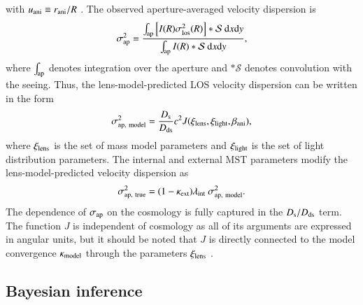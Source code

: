 \documentclass[longauth]{aa}
\newcommand{\Ds}{D_{\rm s}}
\newcommand{\Dds}{D_{\rm ds}}
\newcommand{\rmd}{{\rm d}}
\newcommand{\ajs}[1]{{{#1}}}
\newcommand{\ajsiv}[1]{{{#1}}}
\newcommand{\lreply}[1]{{{#1}}}
\begin{document}
%
with $u_{\rm ani} \equiv r_{\rm ani}/R$ \citep{Mamon05}. The observed aperture-averaged velocity dispersion is
%
\begin{equation} \label{eq:jeans_solution_convolved}
        \sigma_{\rm ap}^2 = \frac{\int_{\rm ap} \left[ I(R) \sigma_{\rm los}^2(R) \right] * \mathcal{S}\ \rmd x \rmd y}{\int_{\rm ap} I(R) * \mathcal{S} \ \rmd x \rmd y},
\end{equation}
%
where $\int_{\rm ap}$ denotes integration over the aperture and $* \mathcal{S}$ denotes convolution with the seeing. Thus, the lens-model-predicted LOS velocity dispersion can be written in the form
%
\begin{equation} \label{eq:vdisp_ap}
        \sigma_{\rm ap,\ model}^2 = \frac{\Ds}{\Dds} c^2 J(\xi_{\rm lens}, \xi_{\rm light}, \beta_{\rm ani}),
\end{equation}
% 
where $\xi_{\rm lens}$ is the set of mass model parameters \ajsiv{and} $\xi_{\rm light}$ is the set of light distribution parameters. \ajs{The internal and external MST parameters modify the lens-model-predicted velocity dispersion as}  
%
\begin{equation} \label{eq:vdisp_ap}
        \sigma_{\rm ap,\ true}^2 = (1 - \kappa_{\rm ext}) \lambda_{\rm int} \ \sigma_{\rm ap,\ model}^2.
\end{equation}
% 
The dependence of $\sigma_{\rm ap}$ on the cosmology is fully captured in the \ajs{$\Ds/\Dds$} term. The function $J$ is independent of cosmology as all of its arguments are expressed in angular units, \ajs{but \lreply{it should be noted} that $J$ is directly connected to the model convergence $\kappa_{\rm model}$ through the parameters $\xi_{\rm lens}$} \citep{Birrer16}.

\subsection{Bayesian inference} \label{sec:bayesian_inference}
\end{document}
